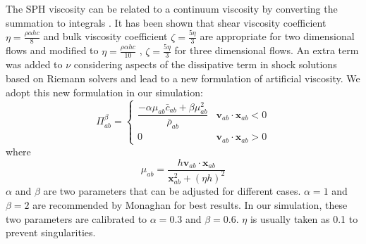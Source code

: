 The SPH viscosity can be related to a continuum viscosity by converting the summation to integrals \citep{monaghan2005smoothed}. It has been shown that  shear viscosity coefficient $\eta = \frac{\rho \alpha h c}{8} $ and bulk viscosity coefficient $ \zeta = \frac{5 \eta}{3}$ are appropriate for two dimensional flows and modified to $\eta = \frac{\rho \alpha h c}{10} $ , $ \zeta = \frac{5 \eta}{3}$ for three dimensional flows.
An extra term was added to $\nu$ considering aspects of the dissipative term in shock solutions based on Riemann solvers and lead to a new formulation of artificial viscosity. We adopt this new formulation in our simulation:
\begin{equation}
\Pi_{ab}^{\beta} = 
\begin{cases} 
      \dfrac{- \alpha \mu_{ab} \bar{c}_{ab} + \beta \mu_{ab}^2} {\bar{\rho}_{ab}} & \textbf{v}_{ab} \cdot \textbf{x}_{ab} < 0\\
      0 & \textbf{v}_{ab} \cdot \textbf{x}_{ab} > 0
\end{cases}
\label{eq:art-vis-shock}
\end{equation}
where
\begin{equation}
\mu_{ab} = \dfrac{h \textbf{v}_{ab} \cdot \textbf{x}_{ab}}{\textbf{x}_{ab}^2 + \left(\eta h\right)^2} 
\end{equation}
$\alpha$ and $\beta$ are two parameters that can be adjusted for different cases.
$\alpha = 1$ and $\beta = 2$ are  recommended by Monaghan for best results. In our simulation, these two parameters are calibrated to  $\alpha = 0.3$ and $\beta = 0.6$. $\eta$ is usually taken as 0.1 to prevent singularities.

